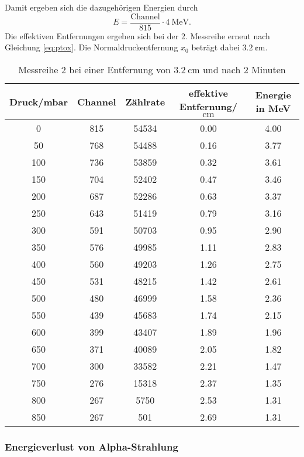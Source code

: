 Damit ergeben sich die dazugehörigen Energien durch
\begin{equation}
  E=\frac{\text{Channel}}{815}\cdot \qty{4}{\mega\electronvolt}.
  \label{eq:En2}
\end{equation} 
Die effektiven Entfernungen ergeben sich bei der 2. Messreihe erneut nach Gleichung \eqref{eq:ptox}.
Die Normaldruckentfernung $x_0$ beträgt dabei $\qty{3.2}{\cent\meter}$.
\begin{table}[H]
  \centering
  \caption{Messreihe 2 bei einer Entfernung von $\qty{3.2}{\centi\meter}$ und nach 2 Minuten}
  \label{tab:Mess2}
  \begin{tabular}{S[table-format=4] S[table-format=3] S[table-format=5] S[table-format=1.2] S[table-format=1.2]}
    \toprule
      {Druck/mbar} & {Channel} & {Zählrate}&{effektive Entfernung/$\unit{\centi\meter}$} &{Energie in MeV}\\
     & 815 & 54534 & 0.00 & 4.00 \\
      50 & 768 & 54488 & 0.16 & 3.77 \\
      100 & 736 & 53859 & 0.32 & 3.61 \\
      150 & 704 & 52402 & 0.47 & 3.46 \\
      200 & 687 & 52286 & 0.63 & 3.37 \\
      250 & 643 & 51419 & 0.79 & 3.16 \\
      300 & 591 & 50703 & 0.95 & 2.90 \\
      350 & 576 & 49985 & 1.11 & 2.83 \\
      400 & 560 & 49203 & 1.26 & 2.75 \\
      450 & 531 & 48215 & 1.42 & 2.61 \\
      500 & 480 & 46999 & 1.58 & 2.36 \\
      550 & 439 & 45683 & 1.74 & 2.15 \\
      600 & 399 & 43407 & 1.89 & 1.96 \\
      650 & 371 & 40089 & 2.05 & 1.82 \\
      700 & 300 & 33582 & 2.21 & 1.47 \\
      750 & 276 & 15318 & 2.37 & 1.35 \\
      800 & 267 & 5750 & 2.53 & 1.31 \\
      850 & 267 & 501 & 2.69 & 1.31 \\
      \bottomrule
  \end{tabular}
\end{table}
\subsubsection{Energieverlust von Alpha-Strahlung}


